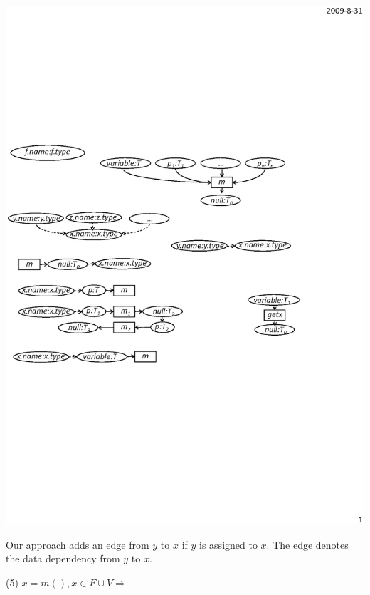 \begin{center}
\includegraphics[scale=0.7,clip]{figure/rule4.eps}%
\end{center}

Our approach adds an edge from $y$ to $x$ if $y$ is assigned to $x$.
The edge denotes the data dependency from $y$ to $x$.

(5) $x=m(), x\in F\cup V \Rightarrow $

